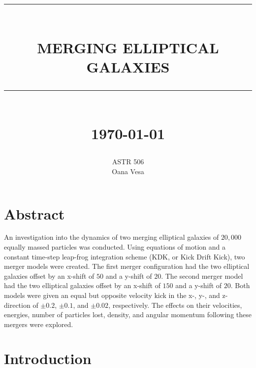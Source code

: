 \documentclass[12pt]{report}
\newcommand{\HRule}[1]{\rule{\linewidth}{#1}}
\begin{document}
\title{ \normalsize \textsc{}
		\\ [2.0cm]
		\HRule{0.5pt} \\
		\LARGE \textbf{\uppercase{Merging Elliptical Galaxies}}
		\HRule{2pt} \\ [0.5cm]
		\normalsize \today \vspace*{5\baselineskip}}

\date{}

\author{ ASTR 506  \\
		Oana Vesa}

\maketitle
\tableofcontents
\newpage

\sectionfont{\scshape}


\section*{Abstract}

An investigation into the dynamics of two merging elliptical galaxies of $20,000$ equally massed particles was conducted. Using equations of motion and a constant time-step leap-frog integration scheme (KDK, or Kick Drift Kick), two merger models were created. The first merger configuration had the two elliptical galaxies offset by an x-shift of $50$ and a y-shift of $20$. The second merger model had the two elliptical galaxies offset by an x-shift of $150$ and a y-shift of $20$. Both models were given an equal but opposite velocity kick in the x-, y-, and z-direction of $\pm 0.2$, $\pm 0.1$, and $\pm 0.02$, respectively. The effects on their velocities, energies, number of particles lost, density, and angular momentum following these mergers were explored.

\newpage

\section*{Introduction}
\end{document}
